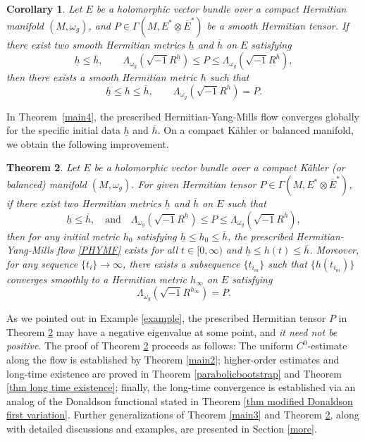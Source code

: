 \documentclass[12pt, reqno]{amsart}
\theoremstyle{plain}
\newtheorem{thm}{Theorem}[section]
\newtheorem{cor}[thm]{Corollary}
\theoremstyle{definition}
\newcommand{\btheorem}{\begin{thm}}
\newcommand{\etheorem}{\end{thm}}
\newcommand{\bcorollary}{\begin{cor}}
\newcommand{\ecorollary}{\end{cor}}
\newcommand{\sq}{\sqrt{-1}}
\renewcommand{\bar}{\overline}
\newcommand{\beq}{\begin{equation}}
\newcommand{\eeq}{\end{equation}}
\newcommand{\qtq}[1]{\quad\mbox{#1}\quad}
\newcommand{\ts}{\otimes}
\renewcommand{\>}{\rightarrow}
\renewcommand{\>}{\rightarrow}
\renewcommand{\bar}{\overline}
\numberwithin{equation}{section} %
\begin{document}
 \bcorollary\label{PHYM2}
 Let  $E$ be a holomorphic vector bundle over a compact Hermitian manifold $(M,\omega_g)$, and  $P\in\Gamma(M,E^*\ts\bar E^*)$ be a smooth Hermitian tensor. If there exist two smooth Hermitian metrics $\underline h$ and $\overline h$ on $E$ satisfying \beq
 \underline h\leq\overline h,
 \qquad
 \Lambda_{\omega_g}\left(\sq R^{\underline h}\right)
 \leq P\leq
 \Lambda_{\omega_g}\left(\sq R^{\overline h}\right),
 \eeq then there exists a smooth Hermitian metric $h$ such that
 \beq
 \underline h\leq h\leq\overline h,
 \qquad
 \Lambda_{\omega_g}\left(\sq R^h\right)=P.
 \label{PHYM3}
 \eeq
 \ecorollary
 
 
 \baselineskip
 
 
 In Theorem~\ref{main4}, the prescribed Hermitian-Yang-Mills flow converges globally for the specific initial data $\underline h$ and $\overline h$.  On a compact K\"ahler or balanced manifold, we obtain the following improvement. 
 
 \btheorem\label{main1}
Let  $E$ be a holomorphic vector bundle over a compact K\"ahler (or balanced) manifold
$(M,\omega_g)$.  For given Hermitian tensor $P\in\Gamma(M,E^*\ts \bar E^*)$,  if there exist two  Hermitian metrics \(\underline h\) and \(\overline h\) on $E$ such that
\beq
\underline h\leq  \overline h, \qtq{and}
\Lambda_{\omega_g}\left(\sq R^{\underline h}\right)\leq P\leq \Lambda_{\omega_g}\left(\sq R^{\overline
    h}\right),
\eeq
then for any  initial metric $h_0$ satisfying  $  \underline h\leq h_0\leq \overline h$,  the
prescribed Hermitian-Yang-Mills flow \eqref{PHYMF}
exists for all $t\in [0,\infty)$ and $ \underline h\leq h(t)\leq \overline h$. Moreover,  for any sequence $\{t_i\}\>\infty$, there exists a subsequence $\{t_{i_m}\}$ such that $\{h(t_{i_m})\}$ converges smoothly to a Hermitian metric $h_\infty$ on $E$ satisfying
\beq
\Lambda_{\omega_g}\left(\sq R^{h_\infty}\right)=P. \label{PHYM}
\eeq
\etheorem
\noindent
As we pointed out in Example \ref{example}, the prescribed Hermitian tensor $P$ in Theorem \ref{main1} may have  a negative
eigenvalue at some point, and \emph{it need not be positive}.  The proof of Theorem \ref{main1} proceeds as follows:  The uniform $C^0$-estimate along the flow is established by Theorem \ref{main2}; higher-order estimates and long-time existence are proved in Theorem \ref{parabolicbootstrap} and  Theorem \ref{thm long time existence}; finally, the long-time convergence is established via an analog of the Donaldson functional stated in Theorem \ref{thm modified Donaldson first variation}. Further generalizations of Theorem \ref{main3} and Theorem \ref{main1}, along with detailed discussions and examples, are presented in Section \ref{more}.
\end{document}
